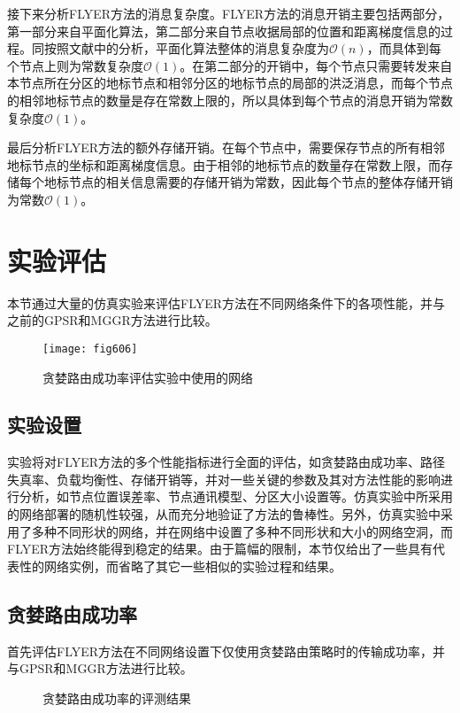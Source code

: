 接下来分析FLYER方法的消息复杂度。FLYER方法的消息开销主要包括两部分，第一部分来自平面化算法，第二部分来自节点收据局部的位置和距离梯度信息的过程。同按照文献中的分析，平面化算法整体的消息复杂度为$\mathcal{O}(n)$，而具体到每个节点上则为常数复杂度$\mathcal{O}(1)$。在第二部分的开销中，每个节点只需要转发来自本节点所在分区的地标节点和相邻分区的地标节点的局部的洪泛消息，而每个节点的相邻地标节点的数量是存在常数上限的，所以具体到每个节点的消息开销为常数复杂度$\mathcal{O}(1)$。

最后分析FLYER方法的额外存储开销。在每个节点中，需要保存节点的所有相邻地标节点的坐标和距离梯度信息。由于相邻的地标节点的数量存在常数上限，而存储每个地标节点的相关信息需要的存储开销为常数，因此每个节点的整体存储开销为常数$\mathcal{O}(1)$。
\section{实验评估}
本节通过大量的仿真实验来评估FLYER方法在不同网络条件下的各项性能，并与之前的GPSR和MGGR方法进行比较。
\begin{figure}[t]
\centering
\texttt{[image: fig606]}
\caption{贪婪路由成功率评估实验中使用的网络}
\label{fig:606}
\end{figure}
\subsection{实验设置}
实验将对FLYER方法的多个性能指标进行全面的评估，如贪婪路由成功率、路径失真率、负载均衡性、存储开销等，并对一些关键的参数及其对方法性能的影响进行分析，如节点位置误差率、节点通讯模型、分区大小设置等。仿真实验中所采用的网络部署的随机性较强，从而充分地验证了方法的鲁棒性。另外，仿真实验中采用了多种不同形状的网络，并在网络中设置了多种不同形状和大小的网络空洞，而FLYER方法始终能得到稳定的结果。由于篇幅的限制，本节仅给出了一些具有代表性的网络实例，而省略了其它一些相似的实验过程和结果。
\subsection{贪婪路由成功率}
首先评估FLYER方法在不同网络设置下仅使用贪婪路由策略时的传输成功率，并与GPSR和MGGR方法进行比较。
\begin{figure}[t]
  \centering
  \hspace{2em}
  \caption{贪婪路由成功率的评测结果}
  \label{fig:607}
\end{figure}

